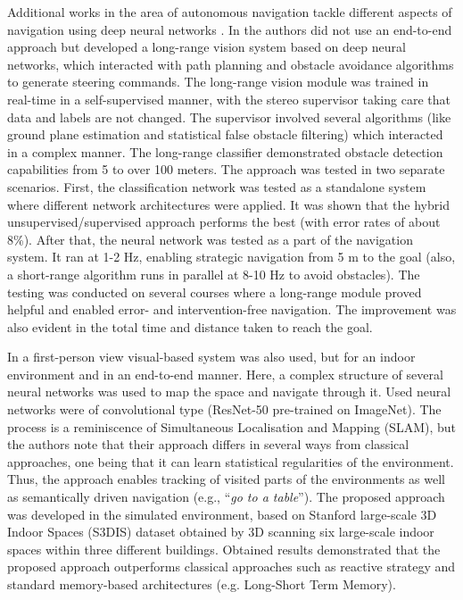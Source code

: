 Additional works in the area of autonomous navigation tackle different aspects of navigation using deep neural networks \cite{Zhu2017,Chen2015,ShalevShwartz2016,Hadsell2009,Gupta2017}. In \cite{Hadsell2009} the authors did not use an end-to-end approach but developed a long-range vision system based on deep neural networks, which interacted with path planning and obstacle avoidance algorithms to generate steering commands. The long-range vision module was trained in real-time in a self-supervised manner, with the stereo supervisor taking care that data and labels are not changed. The supervisor involved several algorithms (like ground plane estimation and statistical false obstacle filtering) which interacted in a complex manner. The long-range classifier demonstrated obstacle detection capabilities from 5 to over 100 meters. The approach was tested in two separate scenarios. First, the classification network was tested as a standalone system where different network architectures were applied. It was shown that the hybrid unsupervised/supervised approach performs the best (with error rates of about 8\%). After that, the neural network was tested as a part of the navigation system. It ran at 1-2 Hz, enabling strategic navigation from 5 m to the goal (also, a short-range algorithm runs in parallel at 8-10 Hz to avoid obstacles). The testing was conducted on several courses where a long-range module proved helpful and enabled error- and intervention-free navigation. The improvement was also evident in the total time and distance taken to reach the goal.

In \cite{Gupta2017} a first-person view visual-based system was also used, but for an indoor environment and in an end-to-end manner. Here, a complex structure of several neural networks was used to map the space and navigate through it. Used neural networks were of convolutional type (ResNet-50 pre-trained on ImageNet). The process is a reminiscence of Simultaneous Localisation and Mapping (SLAM), but the authors note that their approach differs in several ways from classical approaches, one being that it can learn statistical regularities of the environment. Thus, the approach enables tracking of visited parts of the environments as well as semantically driven navigation (e.g., ``\emph{go to a table}''). The proposed approach was developed in the simulated environment, based on Stanford large-scale 3D Indoor Spaces (S3DIS) dataset obtained by 3D scanning six large-scale indoor spaces within three different buildings. Obtained results demonstrated that the proposed approach outperforms classical approaches such as reactive strategy and standard memory-based architectures (e.g. Long-Short Term Memory).

